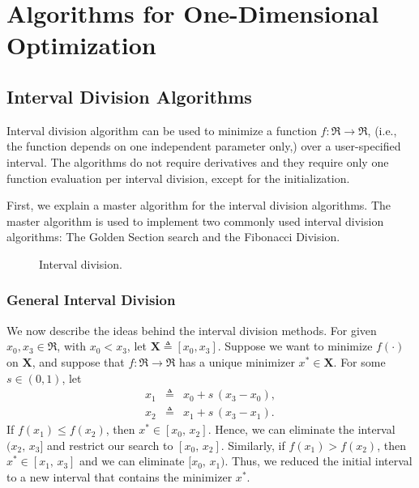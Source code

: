 \chapter{Algorithms for One-Dimensional Optimization}
\label{sec:algOneDimOpt}
\section{Interval Division Algorithms}
Interval division algorithm can be used to minimize a function $f \colon \Re \to \Re$,
(i.e., the function depends on one independent parameter only,)
over a user-specified interval.
The algorithms do not require derivatives and 
they require only one function evaluation per interval division, 
except for the initialization.

First, we explain a master algorithm for the interval division algorithms.
The master algorithm is used to implement two commonly used interval division algorithms: 
The Golden Section search and the Fibonacci Division. 

\begin{figure}
\centering
{}
\caption{Interval division.}
\label{fig:intDivGen}
\end{figure}

\subsection{General Interval Division}
We now describe the ideas behind the interval division methods.
For given $x_0, x_3 \in \Re$, with $x_0 < x_3$,
let $\mathbf X \triangleq [x_0, x_3]$.
Suppose we want to minimize $f(\cdot)$ on $\mathbf X$,
and suppose that $f \colon \Re \rightarrow \Re$ has a unique minimizer 
$x^* \in \mathbf X$.
For some $s \in (0, 1)$, let
\begin{eqnarray}
   x_1 & \triangleq & x_0 + s \, (x_3 - x_0), \\
   x_2 & \triangleq & x_1 + s \, (x_3 - x_1).
\end{eqnarray}
If $f(x_1) \le f(x_2)$, then $x^* \in  [x_0, \, x_2]$.
Hence, we can eliminate the interval $(x_2, \, x_3]$ 
and restrict our search to $[x_0, \, x_2]$.
Similarly, if $f(x_1) > f(x_2)$, then $x^* \in [x_1, \, x_3]$ 
and we can eliminate $[x_0, \, x_1)$.
Thus, we reduced the initial interval to a new interval that contains the minimizer $x^*$.\\

